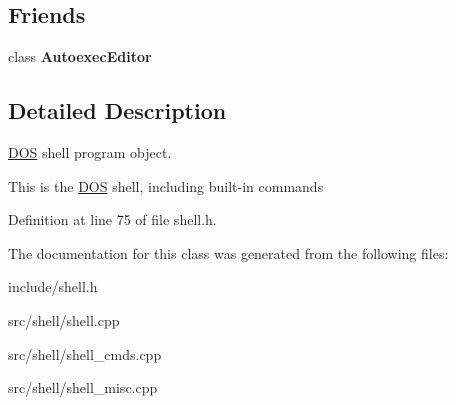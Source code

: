 \subsection*{Friends}
\begin{DoxyCompactItemize}
\item 
\hypertarget{classDOS__Shell_abca6adc7a2081b5b03c267fdae1d0b8d}{class {\bfseries Autoexec\-Editor}}\label{classDOS__Shell_abca6adc7a2081b5b03c267fdae1d0b8d}

\end{DoxyCompactItemize}


\subsection{Detailed Description}
\hyperlink{classDOS}{D\-O\-S} shell program object. 

This is the \hyperlink{classDOS}{D\-O\-S} shell, including built-\/in commands 

Definition at line 75 of file shell.\-h.



The documentation for this class was generated from the following files\-:\begin{DoxyCompactItemize}
\item 
include/shell.\-h\item 
src/shell/shell.\-cpp\item 
src/shell/shell\-\_\-cmds.\-cpp\item 
src/shell/shell\-\_\-misc.\-cpp\end{DoxyCompactItemize}
